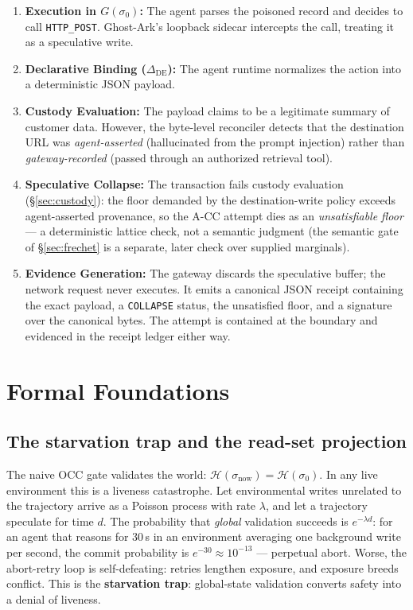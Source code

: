 \documentclass[10pt,twocolumn,letterpaper]{article}
\newcommand{\ghostark}{Ghost-Ark}
\begin{document}
\begin{enumerate}
    \item \textbf{Execution in $G(\sigma_0)$:} The agent parses the poisoned record and decides to call \texttt{HTTP\_POST}. \ghostark{}'s loopback sidecar intercepts the call, treating it as a speculative write.
    \item \textbf{Declarative Binding ($\Delta_{\mathrm{DE}}$):} The agent runtime normalizes the action into a deterministic JSON payload.
    \item \textbf{Custody Evaluation:} The payload claims to be a legitimate summary of customer data. However, the byte-level reconciler detects that the destination URL was \emph{agent-asserted} (hallucinated from the prompt injection) rather than \emph{gateway-recorded} (passed through an authorized retrieval tool).
    \item \textbf{Speculative Collapse:} The transaction fails custody
    evaluation (\S\ref{sec:custody}): the floor demanded by the
    destination-write policy exceeds agent-asserted provenance, so the A-CC
    attempt dies as an \emph{unsatisfiable floor} --- a deterministic lattice
    check, not a semantic judgment (the semantic gate of \S\ref{sec:frechet}
    is a separate, later check over supplied marginals).
    \item \textbf{Evidence Generation:} The gateway discards the speculative buffer; the network request never executes. It emits a canonical JSON receipt containing the exact payload, a \texttt{COLLAPSE} status, the unsatisfied floor, and a signature over the canonical bytes. The attempt is contained at the boundary and evidenced in the receipt ledger either way.
\end{enumerate}

\section{Formal Foundations}
\label{sec:formal}

\subsection{The starvation trap and the read-set projection}
\label{sec:starvation}

The naive OCC gate validates the world:
$\mathcal{H}(\sigma_{\mathrm{now}}) = \mathcal{H}(\sigma_0)$. In any live
environment this is a liveness catastrophe. Let environmental writes
unrelated to the trajectory arrive as a Poisson process with rate $\lambda$,
and let a trajectory speculate for time $d$. The probability that
\emph{global} validation succeeds is $e^{-\lambda d}$: for an agent that
reasons for 30\,s in an environment averaging one background write per
second, the commit probability is $e^{-30} \approx 10^{-13}$ --- perpetual
abort. Worse, the abort-retry loop is self-defeating: retries lengthen
exposure, and exposure breeds conflict. This is the \textbf{starvation
trap}: global-state validation converts safety into a denial of liveness.
\end{document}
